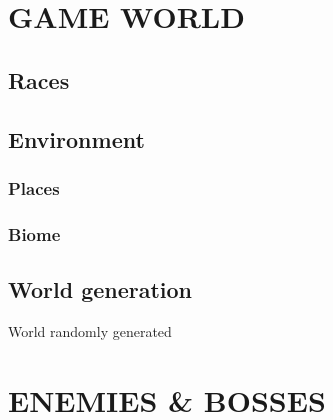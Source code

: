 \documentclass{report}
\begin{document}
\chapter{GAME WORLD}
	\begin{comment}
	Where does the gameplay take place? List the environments the player will visit with short descriptions. How do they tie into the story? What mood is being evoked in each world? How are they connected? (Linear or hub-style navigation?) Include a simple flow diagram of how the player would navigate the world.
	\end{comment}

	\section{Races}
	\section{Environment}
		\subsection*{Places}
		\subsection*{Biome}

	\section{World generation}
		World randomly generated
	


\chapter{ENEMIES \& BOSSES}
	\begin{comment}
		Enemies. If applicable, what kind of enemies does the player face? What kind of cool attacks do they have? Describe the enemy AI. What makes them unique?
		Bosses. If applicable, what kind of boss characters does the player face? What environments do they appear in? How does the player defeat them? What does the player get for defeating them?
	\end{comment}
\end{document}
